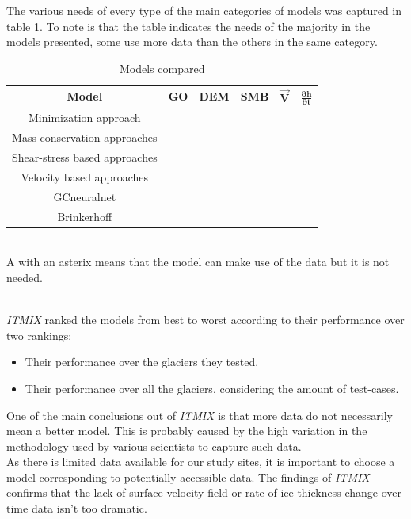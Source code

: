 \documentclass[a4, 12pt]{article}
\begin{document}
The various needs of every type of the main categories of models was captured in table \ref{tab:itmix_models}. To note is that the table indicates the needs of the majority in the models presented, some use more data than the others in the same category.
\begin{table}[h!]
	\centering
	\caption{Models compared} \label{tab:itmix_models}
	\begin{tabular}{|c|c|c|c|c|c|}
	\hline
	Model&\textbf{GO}&\textbf{DEM}&\textbf{SMB}&$\boldsymbol{\vec{V}}$&$\boldsymbol{\frac{\partial h}{\partial t}}$\\
	\hline
	Minimization approach & \checkmark & \checkmark & \checkmark & \checkmark * & \\
	\hline
	Mass conservation approaches & \checkmark & \checkmark & & & \\
	\hline
	Shear-stress based approaches & \checkmark & \checkmark & & & \\
	\hline
	Velocity based approaches & \checkmark & \checkmark & & \checkmark & \\
	\hline
	GCneuralnet & \checkmark & \checkmark & & & \\
	\hline
	Brinkerhoff & \checkmark & \checkmark & \checkmark & \checkmark & \checkmark \\
	\hline
	\end{tabular}
	\\
	\footnotesize A \checkmark with an asterix means that the model can make use of the data but it is not needed.\\
\end{table}
\\
\textit{ITMIX} ranked the models from best to worst according to their performance over two rankings:
\begin{itemize}
	\item Their performance over the glaciers they tested.
	\item Their performance over all the glaciers, considering the amount of test-cases. 
\end{itemize}
One of the main conclusions out of \textit{ITMIX} is that more data do not necessarily mean a better model. This is probably caused by the high variation in the methodology used by various scientists to capture such data.\\As there is limited data available for our study sites, it is important to choose a model corresponding to potentially accessible data. The findings of \textit{ITMIX} confirms that the lack of surface velocity field or rate of ice thickness change over time data isn't too dramatic.
\end{document}
